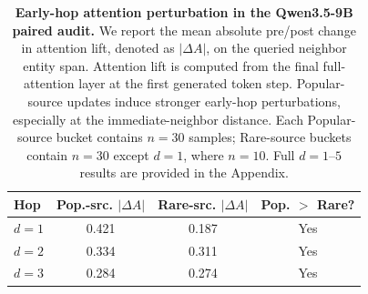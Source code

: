 \begin{table}[t]
\centering
\small
\setlength{\tabcolsep}{5pt}
\begin{tabular}{lccc}
\toprule
Hop & Pop.-src. $|\Delta A|$ & Rare-src. $|\Delta A|$ & Pop. $>$ Rare? \\
\midrule
$d=1$ & 0.421 & 0.187 & Yes \\
$d=2$ & 0.334 & 0.311 & Yes \\
$d=3$ & 0.284 & 0.274 & Yes \\
\bottomrule
\end{tabular}
\caption{\textbf{Early-hop attention perturbation in the Qwen3.5-9B paired audit.}
We report the mean absolute pre/post change in attention lift, denoted as $|\Delta A|$, on the queried neighbor entity span. Attention lift is computed from the final full-attention layer at the first generated token step. Popular-source updates induce stronger early-hop perturbations, especially at the immediate-neighbor distance. Each Popular-source bucket contains $n=30$ samples; Rare-source buckets contain $n=30$ except $d=1$, where $n=10$. Full $d=1$--$5$ results are provided in the Appendix.}
\label{tab:attention_lift_by_hop}
\end{table}